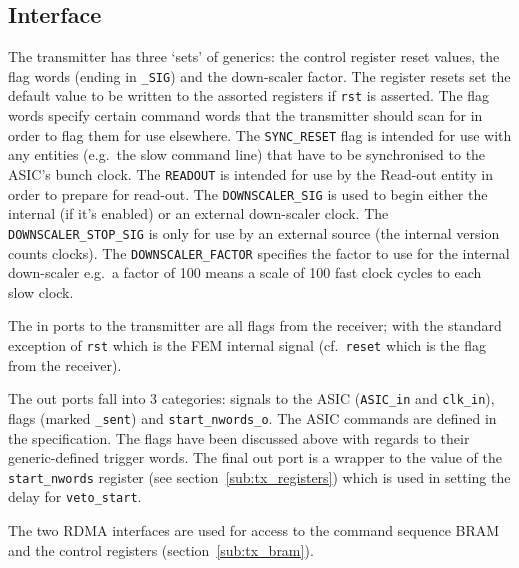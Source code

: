 \subsection{Interface} %
\label{sub:tx_interface}
The transmitter has three `sets' of generics: the control register reset values, the flag words (ending in \texttt{\_SIG}) and the down-scaler factor. The register resets set the default value to be written to the assorted registers if \texttt{rst} is asserted. The flag words specify certain command words that the transmitter should scan for in order to flag them for use elsewhere. The \texttt{SYNC\_RESET} flag is intended for use with any entities (e.g.\ the slow command line) that have to be synchronised to the ASIC's bunch clock. The \texttt{READOUT} is intended for use by the Read-out entity in order to prepare for read-out. The \texttt{DOWNSCALER\_SIG} is used to begin either the internal (if it's enabled) or an external down-scaler clock. The \texttt{DOWNSCALER\_STOP\_SIG} is only for use by an external source (the internal version counts clocks). The \texttt{DOWNSCALER\_FACTOR} specifies the factor to use for the internal down-scaler e.g.\ a factor of 100 means a scale of 100 fast clock cycles to each slow clock.
    
The in ports to the transmitter are all flags from the receiver; with the standard exception of \texttt{rst} which is the FEM internal signal (cf.\ \texttt{reset} which is the flag from the receiver).
    
The out ports fall into 3 categories: signals to the ASIC (\texttt{ASIC\_in} and \texttt{clk\_in}), flags (marked \texttt{\_sent}) and \texttt{start\_nwords\_o}. The ASIC commands are defined in the specification. The flags have been discussed above with regards to their generic-defined trigger words. The final out port is a wrapper to the value of the \texttt{start\_nwords} register (see section~\ref{sub:tx_registers}) which is used in setting the delay for \texttt{veto\_start}.
    
The two RDMA interfaces are used for access to the command sequence BRAM and the control registers (section~\ref{sub:tx_bram}).
    
